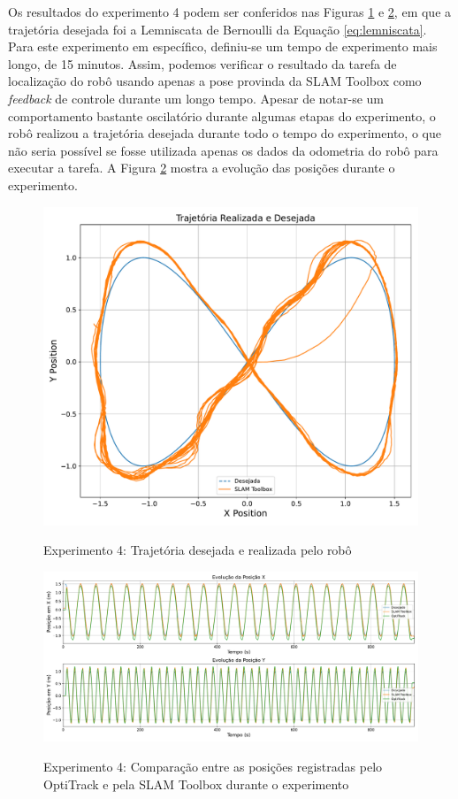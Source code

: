 Os resultados do experimento 4 podem ser conferidos nas Figuras \ref{fig:Exp4_Trajetoria} e \ref{fig:Exp4_Posicao_Tempo}, em que a trajetória desejada foi a Lemniscata de Bernoulli da Equação \ref{eq:lemniscata}. Para este experimento em específico, definiu-se um tempo de experimento mais longo, de 15 minutos. Assim, podemos verificar o resultado da tarefa de localização do robô usando apenas a pose provinda da SLAM Toolbox como \textit{feedback} de controle durante um longo tempo. Apesar de notar-se um comportamento bastante oscilatório durante algumas etapas do experimento, o robô realizou a trajetória desejada durante todo o tempo do experimento, o que não seria possível se fosse utilizada apenas os dados da odometria do robô para executar a tarefa. A Figura \ref{fig:Exp4_Posicao_Tempo} mostra a evolução das posições durante o experimento.

\begin{figure}[htb]
    \centering
    \caption{Experimento 4: Trajetória desejada e realizada pelo robô}
    \includegraphics[width=\linewidth]{img/Resultados/Exp4_SLAM_Control_LEMNISCATA/Trajetoria.pdf}
    \source
    \label{fig:Exp4_Trajetoria}
\end{figure}


\begin{figure}[htb]
    \centering
    \caption{Experimento 4: Comparação entre as posições registradas pelo OptiTrack e pela SLAM Toolbox durante o experimento}
    \includegraphics[width=\linewidth]{img/Resultados/Exp4_SLAM_Control_LEMNISCATA/pose_tempo.pdf}
    \label{fig:Exp4_Posicao_Tempo}
    \source
\end{figure}
